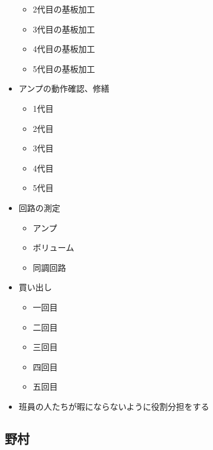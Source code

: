 \documentclass[report.tex]{subfiles}
\begin{document}
\begin{itemize}
\begin{itemize}
		      \item 2代目の基板加工
		      \item 3代目の基板加工
		      \item 4代目の基板加工
		      \item 5代目の基板加工
	      \end{itemize}
	\item アンプの動作確認、修繕
	      \begin{itemize}
		      \item 1代目
		      \item 2代目
		      \item 3代目
		      \item 4代目
		      \item 5代目
	      \end{itemize}
	\item 回路の測定
	      \begin{itemize}
		      \item アンプ
		      \item ボリューム
		      \item 同調回路
	      \end{itemize}
	\item 買い出し
	      \begin{itemize}
		      \item 一回目
		      \item 二回目
		      \item 三回目
		      \item 四回目
		      \item 五回目
	      \end{itemize}
	\item 班員の人たちが暇にならないように役割分担をする
\end{itemize}

\subsection{野村}
\end{document}
